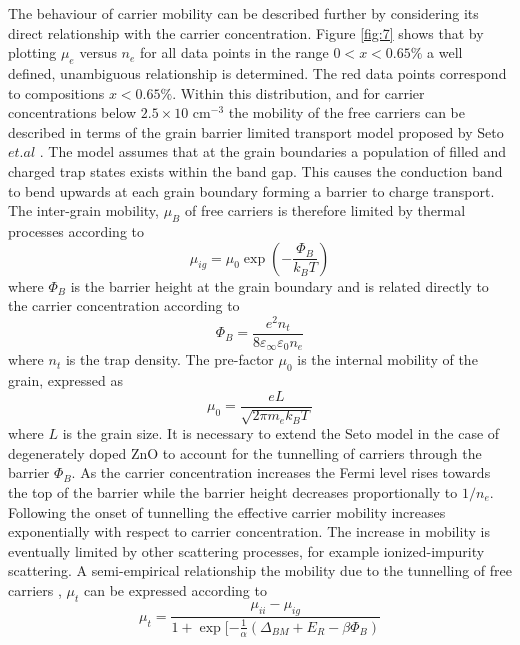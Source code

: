 \documentclass[aps,prl,preprint,showpacs,showkeys, linenumbers]{revtex4-1}
\begin{document}
The behaviour of carrier mobility can be described further by considering its direct relationship with the carrier concentration. Figure \ref{fig:7} shows that by plotting $\mu_e$ versus $n_e$ for all data points in the range $0<x<0.65\%$ a well defined, unambiguous relationship is determined. The red data points correspond to compositions $x<0.65\%$. Within this distribution, and for carrier concentrations below $2.5\times10$ cm$^{-3}$ the mobility of the free carriers can be described in terms of the grain barrier limited transport  model proposed by  Seto $et. al$ \cite{Seto1975}. The model assumes that at the grain boundaries a population of filled and charged trap states exists within the band gap. This causes the conduction band to bend upwards at each grain boundary forming a barrier to charge transport. The inter-grain mobility, $\mu_B$ of free carriers is therefore limited by thermal processes according to 
\begin{equation}
\label{eqn:10}
\mu_{ig} = \mu_0\exp(-\frac{\Phi_B}{k_BT})
\end{equation}
where $\Phi_B$ is the barrier height at the grain boundary and is related directly to the carrier concentration according to
\begin{equation}
\label{eqn:11}
\Phi_B=\frac{e^2n_t}{8\varepsilon_{\infty}\varepsilon_0n_e}
\end{equation}
where $n_t$ is the trap density. The pre-factor $\mu_0$ is the internal mobility of the grain, expressed as
\begin{equation}
\label{eqn:12}
\mu_0=\frac{eL}{\sqrt{2\pi m_ek_BT}}
\end{equation}
where $L$ is the grain size. It is necessary to extend the Seto model in the case of degenerately doped ZnO to account for the tunnelling of carriers through the barrier $\Phi_B$. As the carrier concentration increases the Fermi level rises towards the top of the barrier while the barrier height decreases proportionally to $1/n_e$. Following the onset of tunnelling the effective carrier mobility increases exponentially with respect to carrier concentration. The increase in mobility is eventually limited by other scattering processes, for example ionized-impurity scattering. A semi-empirical relationship the mobility due to the tunnelling of free carriers , $\mu_t$ can be expressed according to
\begin{equation}
\label{eqn:13}
\mu_t = \frac{\mu_{ii}-\mu_{ig}}{1+\exp[-\frac{1}{\alpha}(\Delta_{BM}+E_R-\beta\Phi_B)}
\end{equation}
\end{document}
